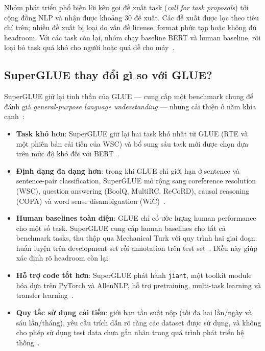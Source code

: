 Nhóm phát triển phổ biến lời kêu gọi đề xuất task (\textit{call for task proposals}) tới cộng đồng NLP và nhận được khoảng 30 đề xuất. Các đề xuất được lọc theo tiêu chí trên; nhiều đề xuất bị loại do vấn đề license, format phức tạp hoặc không đủ headroom. Với các task còn lại, nhóm chạy baseline BERT và human baseline, rồi loại bỏ task quá khó cho người hoặc quá dễ cho máy~\cite{superglue}.

\subsection{SuperGLUE thay đổi gì so với GLUE?}

SuperGLUE giữ lại tinh thần của GLUE --- cung cấp một benchmark chung để đánh giá \textit{general-purpose language understanding} --- nhưng cải thiện ở năm khía cạnh~\cite{superglue}:

\begin{itemize}
    \item \textbf{Task khó hơn}: SuperGLUE giữ lại hai task khó nhất từ GLUE (RTE và một phiên bản cải tiến của WSC) và bổ sung sáu task mới được chọn dựa trên mức độ khó đối với BERT~\cite{superglue}.

    \item \textbf{Định dạng đa dạng hơn}: trong khi GLUE chỉ giới hạn ở sentence và sentence-pair classification, SuperGLUE mở rộng sang coreference resolution (WSC), question answering (BoolQ, MultiRC, ReCoRD), causal reasoning (COPA) và word sense disambiguation (WiC)~\cite{superglue}.

    \item \textbf{Human baselines toàn diện}: GLUE chỉ có ước lượng human performance cho một số task. SuperGLUE cung cấp human baselines cho tất cả benchmark tasks, thu thập qua Mechanical Turk với quy trình hai giai đoạn: huấn luyện trên development set rồi annotation trên test set~\cite{superglue}. Điều này giúp xác định rõ headroom còn lại.

    \item \textbf{Hỗ trợ code tốt hơn}: SuperGLUE phát hành \texttt{jiant}, một toolkit module hóa dựa trên PyTorch và AllenNLP, hỗ trợ pretraining, multi-task learning và transfer learning~\cite{superglue}.

    \item \textbf{Quy tắc sử dụng cải tiến}: giới hạn tần suất nộp (tối đa hai lần/ngày và sáu lần/tháng), yêu cầu trích dẫn rõ ràng các dataset được sử dụng, và không cho phép sử dụng test data chưa gắn nhãn trong quá trình phát triển hệ thống~\cite{superglue}.
\end{itemize}

